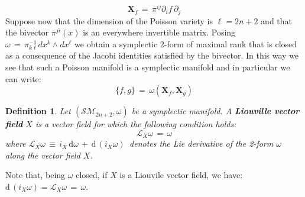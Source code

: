 \documentclass[10pt,a4paper]{article}
\newtheorem{definizione}{Definition}[section]
\begin{document}
\begin{equation}\label{carneadehamilt}
    \mathbf{X}_f \, = \, \pi^{ij}\partial_i f \, \partial_j
\end{equation}
Suppose now that the dimension of the Poisson variety is $\ell=2n+2$ and that the bivector $\pi^{ji}(x)$ is an everywhere invertible matrix. Posing $ \omega \, = \, \pi^{-1}_{k\ell} dx^k
\wedge dx^\ell $ we obtain a symplectic $2$-form of maximal rank that is closed as a consequence of the Jacobi identities satisfied by the bivector. In this way we see that such a Poisson manifold is a symplectic manifold and in particular we can write:
\begin{equation}\label{agniziono}
    \{f,g\} \, = \, \omega\left(\mathbf{X}_f,\mathbf{X}_g\right)
\end{equation}
\begin{definizione}
\label{liuvillocampillo} Let
$\left(\mathcal{SM}_{2n+2},\omega\right)$ be a symplectic manifold. A   \textbf{ Liouville vector field} $X$ is
a vector field for which the following condition holds:
\begin{equation}\label{taleggio}
   {\mathcal{L}_X\omega \,=\,\omega}
\end{equation}
where $\mathcal{L}_X\omega\, \equiv \, i_X\,
  \mathrm{d}\omega \, + \, \mathrm{d}\,(i_X\omega)\,$  denotes the Lie  derivative of the 2-form $\omega$ along the  vector field $X$.
\end{definizione}
Note that, being $\omega$ closed, if $X$ is a Liouvile vector field, we have: $\mathrm{d}\,(i_X\omega)=\mathcal{L}_X\omega\, =\,\omega$.
\end{document}
